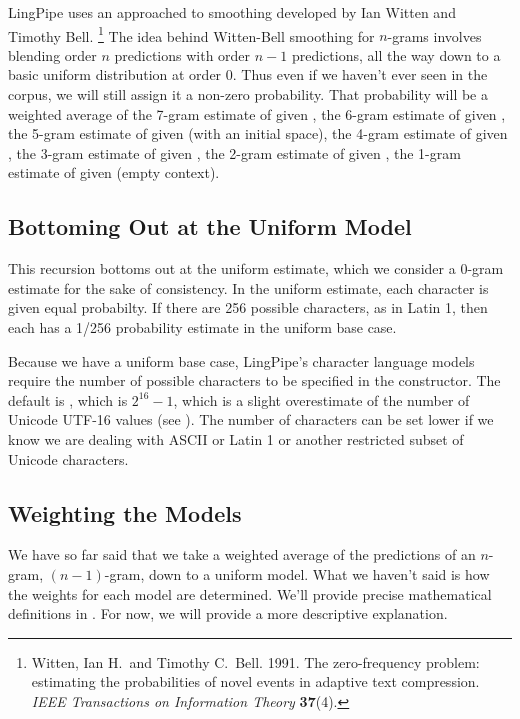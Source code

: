 LingPipe uses an approached to smoothing developed by Ian Witten and Timothy Bell.%
%
\footnote{Witten, Ian H.\ and Timothy C.~Bell. 1991. The zero-frequency
  problem: estimating the probabilities of novel events in adaptive
  text compression. {\it IEEE Transactions on Information Theory} {\bf 37}(4).}
%
The idea behind Witten-Bell smoothing for $n$-grams involves blending
order $n$ predictions with order $n-1$ predictions, all the way down
to a basic uniform distribution at order 0.  Thus even if we haven't
ever seen  in the corpus, we will still assign
it a non-zero probability.  That probability will be a weighted
average of the 7-gram estimate of  given
, the 6-gram estimate of  given
, the 5-gram estimate of  given
 (with an initial space), the 4-gram estimate of
 given , the 3-gram estimate of
 given , the 2-gram estimate of
 given , the 1-gram estimate of
 given \stringmention{} (empty context).  

\subsection{Bottoming Out at the Uniform Model}

This recursion bottoms out at the uniform estimate, which we consider
a 0-gram estimate for the sake of consistency.  In the uniform
estimate, each character is given equal probabilty.  If there are 256
possible characters, as in Latin 1, then each has a 1/256 probability
estimate in the uniform base case.  

Because we have a uniform base case, LingPipe's character language
models require the number of possible characters to be specified in
the constructor.  The default is , which is
$2^{16}-1$, which is a slight overestimate of the number of Unicode
UTF-16 values (see ).  The number of characters
can be set lower if we know we are dealing with ASCII or Latin 1 or
another restricted subset of Unicode characters.

\subsection{Weighting the Models}

We have so far said that we take a weighted average of the predictions
of an $n$-gram, $(n-1)$-gram, down to a uniform model.  What we haven't
said is how the weights for each model are determined.  We'll provide
precise mathematical definitions in .  For now, we
will provide a more descriptive explanation.

